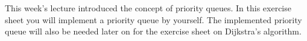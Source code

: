 This week's lecture introduced the concept of priority queues. In this exercise sheet you will implement a priority queue by yourself. The implemented priority queue will also be needed later on for the exercise sheet on Dijkstra's algorithm.
